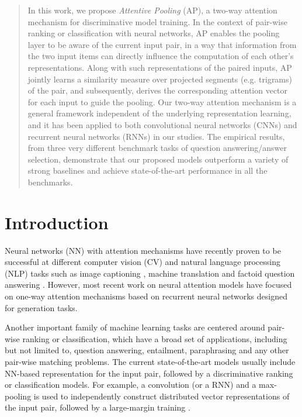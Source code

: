 \documentclass{article}
\begin{document}
 


\begin{abstract} 
In this work,
we propose \emph{Attentive Pooling} (AP),
a two-way attention mechanism for discriminative model training.
In the context of pair-wise ranking or classification with neural networks,
AP enables the pooling layer to be aware of the current input pair, 
in a way that information from the two input items can directly influence the computation of each other's representations.
Along with such representations of the paired inputs, AP jointly learns a similarity measure over projected segments (e.g. trigrams) of the pair, and subsequently, derives the corresponding attention vector for each input to guide the pooling. 
Our two-way attention mechanism is a general framework independent of the underlying representation learning,
and it has been applied to both convolutional neural networks (CNNs) and recurrent neural networks (RNNs) 
in our studies.
The empirical results, from three very different benchmark tasks of question answering/answer selection, 
demonstrate that our proposed models outperform a variety of strong baselines and achieve state-of-the-art performance in all the benchmarks.

\end{abstract} 

\section{Introduction}
\label{introduction}
Neural networks (NN) with attention mechanisms have recently proven to be successful at different computer vision (CV) and natural language processing (NLP) tasks such as image captioning \cite{xu:icml2015},
machine translation \cite{bahdanau2015:ICLR} and 
factoid question answering \cite{moritz:NIPS2015}.
However, most recent work on neural attention models have focused on one-way attention mechanisms based on recurrent neural networks designed for generation tasks.

Another important family of machine learning tasks are centered around pair-wise ranking or classification, 
which have a broad set of applications, including but not limited to, question answering, entailment, 
paraphrasing and any other pair-wise matching problems.
The current state-of-the-art models usually include NN-based representation for the input pair, followed by a discriminative ranking or classification models. For example, a convolution (or a RNN) and a max-pooling is used to independently construct distributed vector representations of the input pair, followed by a large-margin training \cite{hu2014,weston2014,Shen@CIKM2014,dos2015learning}.
\end{document}
